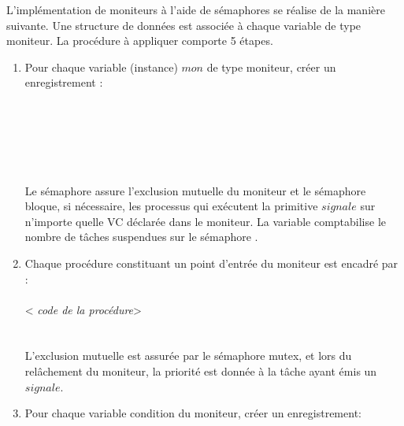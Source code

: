 L'implémentation de moniteurs à l'aide de sémaphores se réalise de la manière suivante.  Une structure de données est associée à chaque variable de type moniteur.
La procédure à appliquer comporte 5 étapes.
\begin{enumerate}
\item Pour chaque variable (instance) $mon$ de type moniteur, créer un enregistrement : \\
\hspace*{0.3cm} \\
\hspace*{0.7cm} \\
\hspace*{0.7cm} \\
\hspace*{0.7cm} \\
\hspace*{0.3cm} \\
\hspace*{0.3cm} \\
Le sémaphore  assure l'exclusion mutuelle du moniteur et le sémaphore  bloque, si nécessaire, les processus qui exécutent la primitive $signale$ sur n'importe quelle VC déclarée dans le moniteur.  La variable  comptabilise le nombre de tâches suspendues sur le sémaphore .

\item Chaque procédure constituant un point d'entrée du moniteur est encadré par : \\
\hspace*{0.3cm} \\
\hspace*{0.3cm}< {\em code de la procédure}>  \\
\hspace*{0.3cm} \\
\hspace*{0.3cm} \\
L'exclusion mutuelle est assurée par le sémaphore {mutex}, et lors du relâchement du moniteur, la priorité est donnée à la tâche ayant émis un $signale$.

\item Pour chaque variable condition  du moniteur, créer un enregistrement: \\
\hspace*{0.3cm} \\
\hspace*{0.7cm} \\
\hspace*{0.7cm} \\
\hspace*{0.3cm} \\
\hspace*{0.3cm}


\end{enumerate}
